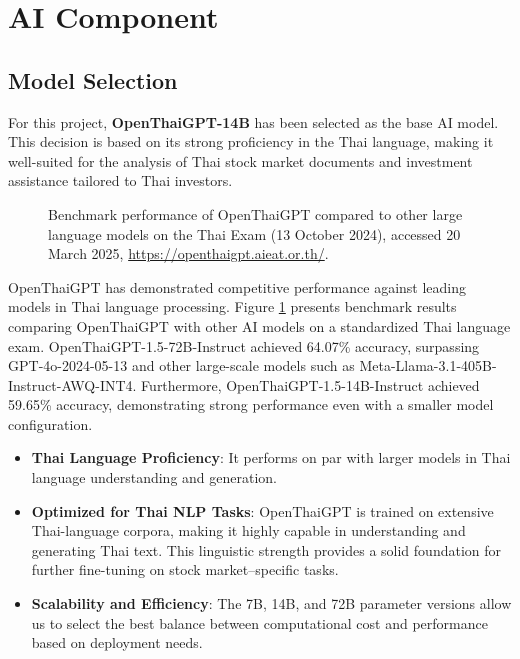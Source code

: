 \section{AI Component}
\label{section:ai-component}

\subsection{Model Selection}
\label{subsection:model-selection}

For this project, \textbf{OpenThaiGPT-14B} has been selected as the base AI model. This decision is based on its strong proficiency in the Thai language, 
making it well-suited for the analysis of Thai stock market documents and investment assistance tailored to Thai investors\cite{yuenyong2024openthaigpt15thaicentricopen}.

\begin{figure}[h]
    \centering
    \caption[Performance of OpenThaiGPT on Thai Exam Benchmark]{Benchmark performance of OpenThaiGPT compared to other large language models on the Thai Exam (13 October 2024), accessed 20 March 2025, \url{https://openthaigpt.aieat.or.th/}.}
    \label{fig:openthaigpt-thai-exam-benchmark}
\end{figure}

\FloatBarrier

OpenThaiGPT has demonstrated competitive performance against leading models in Thai language processing.
Figure \ref{fig:openthaigpt-thai-exam-benchmark} presents benchmark results comparing OpenThaiGPT with other AI models on a standardized Thai language exam.
OpenThaiGPT-1.5-72B-Instruct achieved 64.07\% accuracy, surpassing GPT-4o-2024-05-13 and other large-scale models such as Meta-Llama-3.1-405B-Instruct-AWQ-INT4. 
Furthermore, OpenThaiGPT-1.5-14B-Instruct achieved 59.65\% accuracy, demonstrating strong performance even with a smaller model configuration\cite{OpenThaiGPT}.

\begin{itemize}[leftmargin=60pt]
    \item \textbf{Thai Language Proficiency}: It performs on par with larger models in Thai language understanding and generation.
    \item \textbf{Optimized for Thai NLP Tasks}: OpenThaiGPT is trained on extensive Thai-language corpora, making it highly capable in understanding and generating Thai text. This linguistic strength provides a solid foundation for further fine-tuning on stock market–specific tasks.
    \item \textbf{Scalability and Efficiency}: The 7B, 14B, and 72B parameter versions allow us to select the best balance between computational cost and performance based on deployment needs.
\end{itemize}

